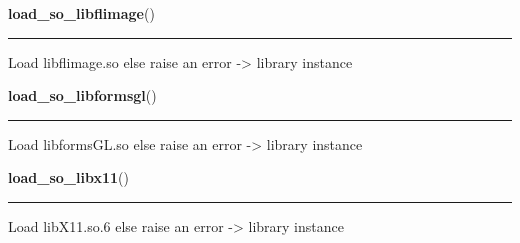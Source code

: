     \label{xformslib:library:load_so_libflimage}

    \vspace{0.5ex}

\hspace{.8\funcindent}\begin{boxedminipage}{\funcwidth}

    \raggedright \textbf{load\_so\_libflimage}()

    \vspace{-1.5ex}

    \rule{\textwidth}{0.5\fboxrule}
\setlength{\parskip}{2ex}

Load libflimage.so else raise an error -> library instance
\setlength{\parskip}{1ex}
    \end{boxedminipage}

    \label{xformslib:library:load_so_libformsgl}

    \vspace{0.5ex}

\hspace{.8\funcindent}\begin{boxedminipage}{\funcwidth}

    \raggedright \textbf{load\_so\_libformsgl}()

    \vspace{-1.5ex}

    \rule{\textwidth}{0.5\fboxrule}
\setlength{\parskip}{2ex}

Load libformsGL.so else raise an error -> library instance
\setlength{\parskip}{1ex}
    \end{boxedminipage}

    \label{xformslib:library:load_so_libx11}

    \vspace{0.5ex}

\hspace{.8\funcindent}\begin{boxedminipage}{\funcwidth}

    \raggedright \textbf{load\_so\_libx11}()

    \vspace{-1.5ex}

    \rule{\textwidth}{0.5\fboxrule}
\setlength{\parskip}{2ex}

Load libX11.so.6 else raise an error -> library instance
\setlength{\parskip}{1ex}
    \end{boxedminipage}

